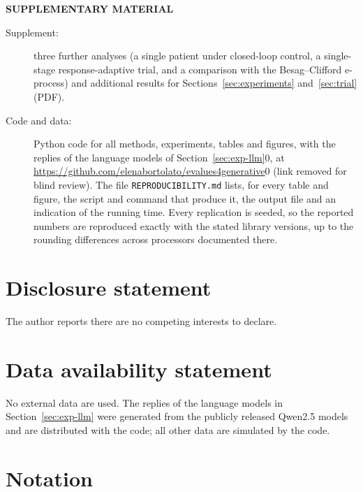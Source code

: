 \documentclass[12pt]{article}
\theoremstyle{remark}
\newcommand{\blind}{0}
\begin{document}
\bigskip
\begin{center}
{\large\bf SUPPLEMENTARY MATERIAL}
\end{center}

\begin{description}
\item[Supplement:] three further analyses (a single patient under closed-loop
control, a single-stage response-adaptive trial, and a comparison with the
Besag--Clifford e-process) and additional results for Sections~\ref{sec:experiments}
and~\ref{sec:trial} (PDF).
\item[Code and data:] Python code for all methods, experiments, tables and
figures, with the replies of the language models of
Section~\ref{sec:exp-llm}\blind, at \url{https://github.com/elenabortolato/evalues4generative}\fi{}\blind{} (link removed for blind review)\fi. The file \texttt{REPRODUCIBILITY.md} lists,
for every table and figure, the script and command that produce it, the
output file and an indication of the running time. Every replication is
seeded, so the reported numbers are reproduced exactly with the stated library
versions, up to the rounding differences across processors documented there.
\end{description}

\section*{Disclosure statement}
The author reports there are no competing interests to declare.

\section*{Data availability statement}
No external data are used. The replies of the language models in
Section~\ref{sec:exp-llm} were generated from the publicly released Qwen2.5
models and are distributed with the code; all other data are simulated by the
code.




\appendix



\section{Notation}\label{app:notation}
\end{document}
